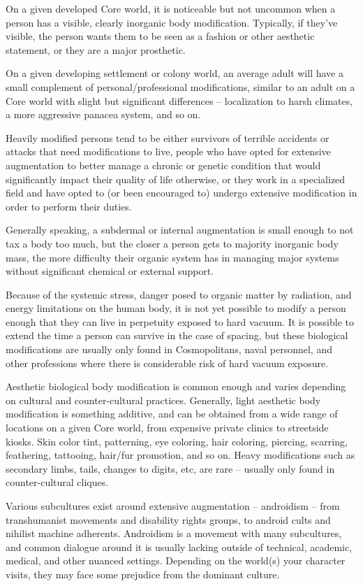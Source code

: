 On a given developed Core world, it is noticeable but not uncommon when a person has a
visible, clearly inorganic body modification. Typically, if they’ve visible, the person wants them to
be seen as a fashion or other aesthetic statement, or they are a major prosthetic.

On a given developing settlement or colony world, an average adult will have a small
complement of personal/professional modifications, similar to an adult on a Core world with
slight but significant differences -- localization to harsh climates, a more aggressive panacea
system, and so on.

Heavily modified persons tend to be either survivors of terrible accidents or attacks that need
modifications to live, people who have opted for extensive augmentation to better manage a
chronic or genetic condition that would significantly impact their quality of life otherwise, or they
work in a specialized field and have opted to (or been encouraged to) undergo extensive
modification in order to perform their duties.

Generally speaking, a subdermal or internal augmentation is small enough to not tax a body too
much, but the closer a person gets to majority inorganic body mass, the more difficulty their
organic system has in managing major systems without significant chemical or external support.

Because of the systemic stress, danger posed to organic matter by radiation, and energy
limitations on the human body, it is not yet possible to modify a person enough that they can live
in perpetuity exposed to hard vacuum. It is possible to extend the time a person can survive in
the case of spacing, but these biological modifications are usually only found in Cosmopolitans,
naval personnel, and other professions where there is considerable risk of hard vacuum
exposure.

Aesthetic biological body modification is common enough and varies depending on cultural and
counter-cultural practices. Generally, light aesthetic body modification is something additive, and
can be obtained from a wide range of locations on a given Core world, from expensive private
clinics to streetside kiosks. Skin color tint, patterning, eye coloring, hair coloring, piercing,
scarring, feathering, tattooing, hair/fur promotion, and so on. Heavy modifications such as
secondary limbs, tails, changes to digits, etc, are rare -- usually only found in counter-cultural
cliques.

Various subcultures exist around extensive augmentation -- androidism -- from transhumanist
movements and disability rights groups, to android cults and nihilist machine adherents.
Androidism is a movement with many subcultures, and common dialogue around it is usually
lacking outside of technical, academic, medical, and other nuanced settings. Depending on the
world(s) your character visits, they may face some prejudice from the dominant culture.

